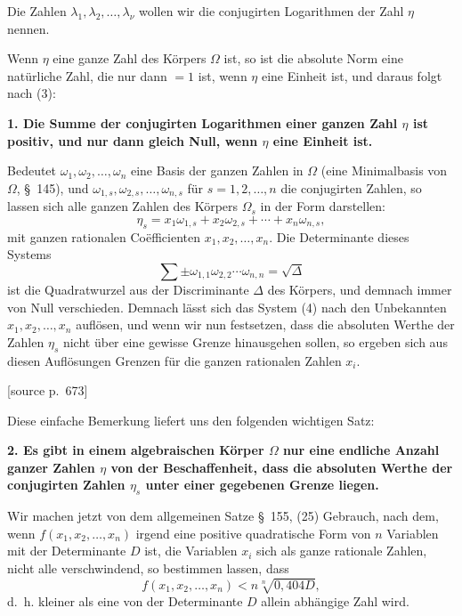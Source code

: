 \documentclass[11pt]{article}
\newcommand{\srcpage}[1]{\par\medskip\noindent\textsf{[source p.~#1]}\par\smallskip}
\begin{document}
Die Zahlen $\lambda_1,\lambda_2,\ldots,\lambda_\nu$ wollen wir die conjugirten Logarithmen der Zahl $\eta$ nennen.

Wenn $\eta$ eine ganze Zahl des Körpers $\Omega$ ist, so ist die absolute Norm eine natürliche Zahl, die nur dann $=1$ ist, wenn $\eta$ eine Einheit ist, und daraus folgt nach (3):

\textbf{1. Die Summe der conjugirten Logarithmen einer ganzen Zahl $\eta$ ist positiv, und nur dann gleich Null, wenn $\eta$ eine Einheit ist.}

Bedeutet $\omega_1,\omega_2,\ldots,\omega_n$ eine Basis der ganzen Zahlen in $\Omega$ (eine Minimalbasis von $\Omega$, \S~145), und $\omega_{1,s},\omega_{2,s},\ldots,\omega_{n,s}$ für $s=1,2,\ldots,n$ die conjugirten Zahlen, so lassen sich alle ganzen Zahlen des Körpers $\Omega_s$ in der Form darstellen:
\begin{equation}
\eta_s=x_1\omega_{1,s}+x_2\omega_{2,s}+\cdots+x_n\omega_{n,s},
\tag{4}
\end{equation}
mit ganzen rationalen Coëfficienten $x_1,x_2,\ldots,x_n$. Die Determinante dieses Systems
\[
\sum \pm \omega_{1,1}\omega_{2,2}\cdots\omega_{n,n}=\sqrt{\Delta}
\]
ist die Quadratwurzel aus der Discriminante $\Delta$ des Körpers, und demnach immer von Null verschieden. Demnach lässt sich das System (4) nach den Unbekannten $x_1,x_2,\ldots,x_n$ auflösen, und wenn wir nun festsetzen, dass die absoluten Werthe der Zahlen $\eta_s$ nicht über eine gewisse Grenze hinausgehen sollen, so ergeben sich aus diesen Auflösungen Grenzen für die ganzen rationalen Zahlen $x_i$.

\srcpage{673}
Diese einfache Bemerkung liefert uns den folgenden wichtigen Satz:

\textbf{2. Es gibt in einem algebraischen Körper $\Omega$ nur eine endliche Anzahl ganzer Zahlen $\eta$ von der Beschaffenheit, dass die absoluten Werthe der conjugirten Zahlen $\eta_s$ unter einer gegebenen Grenze liegen.}

Wir machen jetzt von dem allgemeinen Satze \S~155, (25) Gebrauch, nach dem, wenn $f(x_1,x_2,\ldots,x_n)$ irgend eine positive quadratische Form von $n$ Variablen mit der Determinante $D$ ist, die Variablen $x_i$ sich als ganze rationale Zahlen, nicht alle verschwindend, so bestimmen lassen, dass
\[
f(x_1,x_2,\ldots,x_n)< n\sqrt[n]{0{,}404D},
\]
d.~h. kleiner als eine von der Determinante $D$ allein abhängige Zahl wird.
\end{document}
